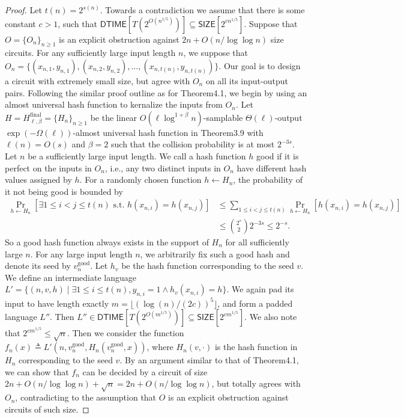 \begin{proof}
Let $t(n)=2^{s(n)}$. Towards a contradiction we assume that there is some constant $c>1$, such that $\mathsf{DTIME}[T(2^{O(n^{1/5})})]\subseteq\mathsf{SIZE}[2^{cn^{1/5}}]$. Suppose that $O=\{O_n\}_{n\ge1}$ is an explicit obstruction against $2n+O(n/\log\log n)$ size circuits. For any sufficiently large input length $n$, we suppose that $O_n=\{(x_{n,1},y_{n,1}),(x_{n,2},y_{n,2}),\ldots,(x_{n,t(n)},y_{n,t(n)})\}$. Our goal is to design a circuit with extremely small size, but agree with $O_n$ on all its input-output pairs. Following the similar proof outline as for Theorem4.1, we begin by using an almost universal hash function to kernalize the inputs from $O_n$.
Let $H=H^{\mathrm{final}}_{\ell,\beta}=\{H_n\}_{n\ge1}$ be the linear $O(\ell\log^{1+\beta}n)$-samplable $\Theta(\ell)$-output $\exp(-\Omega(\ell))$-almost universal hash function in Theorem3.9 with $\ell(n)=O(s)$ and $\beta=2$ such that the collision probability is at most $2^{-3s}$. Let $n$ be a sufficiently large input length. We call a hash function $h$ good if it is perfect on the inputs in $O_n$, i.e., any two distinct inputs in $O_n$ have different hash values assigned by $h$. For a randomly chosen function $h\leftarrow H_n$, the probability of it not being good is bounded by
\begin{align*}
\Pr_{h\leftarrow H_n}[\exists1\le i<j\le t(n)\text{ s.t. }h(x_{n,i})=h(x_{n,j})]
&\le\sum_{1\le i<j\le t(n)}\Pr_{h\leftarrow H_n}[h(x_{n,i})=h(x_{n,j})]\\
&\le\binom{2^s}2 2^{-3s}\le2^{-s}.
\end{align*}
So a good hash function always exists in the support of $H_n$ for all sufficiently large $n$. For any large input length $n$, we arbitrarily fix such a good hash and denote its seed by $v_n^{\mathrm{good}}$.
Let $h_v$ be the hash function corresponding to the seed $v$. We define an intermediate language $L'=\{(n,v,h)\mid\exists1\le i\le t(n),y_{n,i}=1\wedge h_v(x_{n,i})=h\}$. We again pad its input to have length exactly $m=\lfloor(\log(n)/(2c))^5\rfloor$, and form a padded language $L''$. Then $L''\in\mathsf{DTIME}[T(2^{O(m^{1/5})})]\subseteq\mathsf{SIZE}[2^{cm^{1/5}}]$. We also note that $2^{cm^{1/5}}\le\sqrt n$.
Then we consider the function $f_n(x)\triangleq L'(n,v_n^{\mathrm{good}},H_n(v_n^{\mathrm{good}},x))$, where $H_n(v,\cdot)$ is the hash function in $H_n$ corresponding to the seed $v$. By an argument similar to that of Theorem4.1, we can show that $f_n$ can be decided by a circuit of size $2n+O(n/\log\log n)+\sqrt n=2n+O(n/\log\log n)$, but totally agrees with $O_n$, contradicting to the assumption that $O$ is an explicit obstruction against circuits of such size.
\end{proof}
